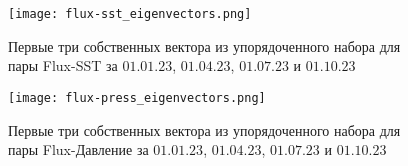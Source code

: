 \begin{figure}
	\centering
	\texttt{[image: flux-sst\_eigenvectors.png]}
	\caption{Первые три собственных вектора из упорядоченного набора для пары Flux-SST за $01.01.23$, $01.04.23$, $01.07.23$ и $01.10.23$}
	\label{fig:Flux-SST_eigenvectors}
\end{figure}

\begin{figure}
	\centering
	\texttt{[image: flux-press\_eigenvectors.png]}
	\caption{Первые три собственных вектора из упорядоченного набора для пары Flux-Давление за $01.01.23$, $01.04.23$, $01.07.23$ и $01.10.23$}
	\label{fig:Flux-press_eigenvectors}
\end{figure}